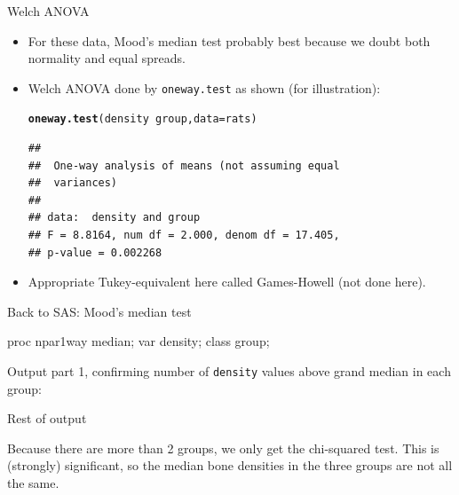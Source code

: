 \documentclass[unknownkeysallowed]{beamer}\usepackage[]{graphicx}\usepackage[]{color}
\makeatletter
\newcommand{\hlopt}[1]{\textcolor[rgb]{0,0,0}{#1}}%
\newcommand{\hlstd}[1]{\textcolor[rgb]{0.345,0.345,0.345}{#1}}%
\newcommand{\hlkwc}[1]{\textcolor[rgb]{0.333,0.667,0.333}{#1}}%
\newcommand{\hlkwd}[1]{\textcolor[rgb]{0.737,0.353,0.396}{\textbf{#1}}}%
\newenvironment{kframe}{%
 \def\at@end@of@kframe{}%
 \ifinner\ifhmode%
  \def\at@end@of@kframe{\end{minipage}}%
  \begin{minipage}{\columnwidth}%
 \fi\fi%
 \def\FrameCommand##1{\hskip\@totalleftmargin \hskip-\fboxsep
 \colorbox{shadecolor}{##1}\hskip-\fboxsep
     \hskip-\linewidth \hskip-\@totalleftmargin \hskip\columnwidth}%
 \MakeFramed {\advance\hsize-\width
   \@totalleftmargin\z@ \linewidth\hsize
   \@setminipage}}%
 {\par\unskip\endMakeFramed%
 \at@end@of@kframe}
\newenvironment{knitrout}{}{} %
\makeatother
\begin{document}
\begin{frame}[fragile]{Welch ANOVA}
  
  \begin{itemize}
  \item For these data, Mood's median test probably best because we
    doubt both normality and equal spreads.
  \item Welch ANOVA done by \texttt{oneway.test} as shown (for illustration):
    
\begin{knitrout}
\color{fgcolor}\begin{kframe}
\begin{alltt}
\hlkwd{oneway.test}\hlstd{(density}\hlopt{~}\hlstd{group,}\hlkwc{data}\hlstd{=rats)}
\end{alltt}
\begin{verbatim}
## 
## 	One-way analysis of means (not assuming equal
## 	variances)
## 
## data:  density and group
## F = 8.8164, num df = 2.000, denom df = 17.405,
## p-value = 0.002268
\end{verbatim}
\end{kframe}
\end{knitrout}
\item Appropriate Tukey-equivalent here called Games-Howell (not done here).
  \end{itemize}
  
\end{frame}

\begin{frame}[fragile]{Back to SAS: Mood's median test}
  
  \begin{Sascode}[store=ja]
proc npar1way median;
  var density;
  class group;
  \end{Sascode}
  
  Output part 1, confirming number of \texttt{density} values above
  grand median in each group:
  
  
\end{frame}

\begin{frame}[fragile]{Rest of output}
  
  
Because there are more than 2 groups, we only get the chi-squared
test. This is (strongly) significant, so the median bone densities in
the three groups are not all the same.

\end{frame}
\end{document}

